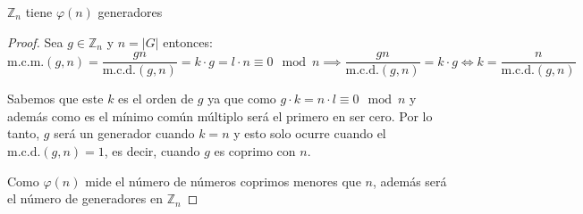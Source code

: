 \begin{thm}
    $\mathbb{Z}_n$ tiene $\varphi(n)$ generadores
\end{thm} 

\begin{proof}
    Sea $g \in \mathbb{Z}_{n}$ y $n = |G|$ entonces:
    \begin{equation}
        \text{m.c.m.}(g,n) = \frac{gn}{\text{m.c.d.}(g,n)} = k\cdot g = l \cdot n \equiv 0 \mod n \implies \frac{gn}{\text{m.c.d.}(g,n)} = k\cdot g \iff k = \frac{n}{\text{m.c.d.}(g,n)}
    \end{equation}

    Sabemos que este $k$ es el orden de $g$ ya que como $g\cdot k = n \cdot l \equiv 0 \mod n$ y además como es el mínimo común múltiplo será el primero en ser cero. Por lo tanto, $g$ será un generador cuando $k=n$ y esto solo ocurre cuando el $\text{m.c.d.}(g,n) = 1$, es decir, cuando $g$ es coprimo con $n$.

    Como $\varphi(n)$ mide el número de números coprimos menores que $n$, además será el número de generadores en $\mathbb{Z}_{n}$
\end{proof}

